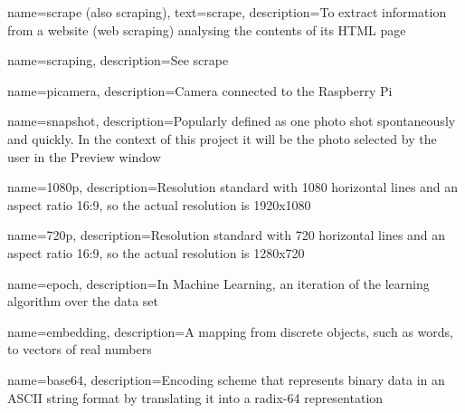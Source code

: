 
{
        name=scrape (\textmd{also} scraping),
        text=scrape,
        description={To extract information from a website (web scraping) analysing the contents of its HTML page}
}

{
        name=scraping,
        description={See \gls{scrape}}
}


{
        name=picamera,
        description={Camera connected to the Raspberry Pi}
}

{
        name=snapshot,
        description={Popularly defined as one photo shot spontaneously and quickly. In the context of this project it will be the photo selected by the user in the Preview window}
}

{
        name=1080p,
        description={Resolution standard with 1080 horizontal lines and an aspect ratio 16:9, so the actual resolution is 1920x1080}
}

{
        name=720p,
        description={Resolution standard with 720 horizontal lines and an aspect ratio 16:9, so the actual resolution is 1280x720}
}

{
        name=epoch,
        description={In Machine Learning, an iteration of the learning algorithm over the data set}
}


{
        name=embedding,
        description={A mapping from discrete objects, such as words, to vectors of real numbers}
}

{
        name=base64,
        description={Encoding scheme that represents binary data in an ASCII string format by translating it into a radix-64 representation}
}

















